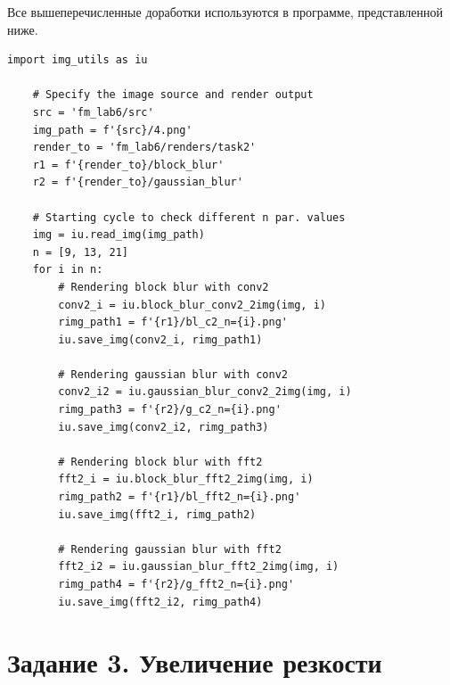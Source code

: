\documentclass[a4paper, 12pt]{article}
\begin{document}
    Все вышеперечисленные доработки используются в программе, представленной ниже.
    \begin{lstlisting}[label=task22, caption={Реализация задания 2}]
    import img_utils as iu

    # Specify the image source and render output
    src = 'fm_lab6/src'
    img_path = f'{src}/4.png'
    render_to = 'fm_lab6/renders/task2'
    r1 = f'{render_to}/block_blur'
    r2 = f'{render_to}/gaussian_blur'

    # Starting cycle to check different n par. values
    img = iu.read_img(img_path)
    n = [9, 13, 21]
    for i in n:
        # Rendering block blur with conv2
        conv2_i = iu.block_blur_conv2_2img(img, i)
        rimg_path1 = f'{r1}/bl_c2_n={i}.png'
        iu.save_img(conv2_i, rimg_path1)

        # Rendering gaussian blur with conv2
        conv2_i2 = iu.gaussian_blur_conv2_2img(img, i)
        rimg_path3 = f'{r2}/g_c2_n={i}.png'
        iu.save_img(conv2_i2, rimg_path3)

        # Rendering block blur with fft2
        fft2_i = iu.block_blur_fft2_2img(img, i)
        rimg_path2 = f'{r1}/bl_fft2_n={i}.png'
        iu.save_img(fft2_i, rimg_path2)

        # Rendering gaussian blur with fft2
        fft2_i2 = iu.gaussian_blur_fft2_2img(img, i)
        rimg_path4 = f'{r2}/g_fft2_n={i}.png'
        iu.save_img(fft2_i2, rimg_path4)
    \end{lstlisting}


    \section{Задание 3. Увеличение резкости}
\end{document}
